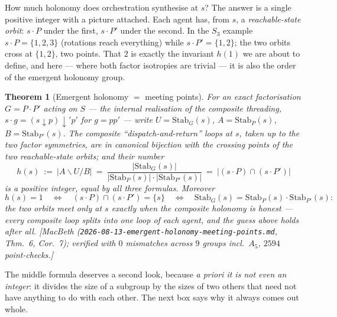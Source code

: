 \documentclass[11pt,a4paper]{book}
\theoremstyle{plain}
\newtheorem{Theorem}{Theorem}[chapter]
\theoremstyle{definition}
\theoremstyle{remark}
\newcommand{\prov}[1]{\hfill\textsf{\footnotesize[#1]}}
\begin{document}
How much holonomy does orchestration synthesise at $s$? The answer is a single positive
integer with a picture attached. Each agent has, from $s$, a \emph{reachable-state
orbit}: $s\cdot P$ under the first, $s\cdot P'$ under the second. In the $S_{3}$ example
$s\cdot P=\{1,2,3\}$ (rotations reach everything) while $s\cdot P'=\{1,2\}$; the two
orbits cross at $\{1,2\}$, two points. That $2$ is exactly the invariant $h(1)$ we are
about to define, and here --- where both factor isotropies are trivial --- it is also the
order of the emergent holonomy group.

\begin{Theorem}[Emergent holonomy $=$ meeting points]\label{thm:meeting-points}
For an exact factorisation $G=P\cdot P'$ acting on $S$ --- the internal realisation of the
composite threading, $s\cdot g=(s\downarrow p)\downarrow' p'$ for $g=pp'$ --- write
$U=\mathrm{Stab}_{G}(s)$, $A=\mathrm{Stab}_{P}(s)$, $B=\mathrm{Stab}_{P'}(s)$. The composite ``dispatch-and-return''
loops at $s$, taken up to the two factor symmetries, are in canonical bijection with the
crossing points of the two reachable-state orbits; and their number
\[
   h(s)\ :=\ |A\backslash U/B|
   \ =\ \frac{|\mathrm{Stab}_{G}(s)|}{|\mathrm{Stab}_{P}(s)|\cdot|\mathrm{Stab}_{P'}(s)|}
   \ =\ \bigl|(s\cdot P)\cap(s\cdot P')\bigr|
\]
is a positive integer, equal by all three formulas. Moreover
\[
   h(s)=1
   \quad\Longleftrightarrow\quad
   (s\cdot P)\cap(s\cdot P')=\{s\}
   \quad\Longleftrightarrow\quad
   \mathrm{Stab}_{G}(s)=\mathrm{Stab}_{P}(s)\cdot\mathrm{Stab}_{P'}(s):
\]
the two orbits meet \emph{only} at $s$ exactly when the composite holonomy is honest ---
every composite loop splits into one loop of each agent, and the guess above holds after
all.
\prov{MacBeth (\texttt{2026-08-13-emergent-holonomy-meeting-points.md}, Thm.~6,
Cor.~7); verified with $0$ mismatches across $9$ groups incl.\ $A_{5}$, $2594$
point-checks.}
\end{Theorem}

The middle formula deserves a second look, because \emph{a priori it is not even an
integer}: it divides the size of a subgroup by the sizes of two others that need not
have anything to do with each other. The next box says why it always comes out whole.
\end{document}
